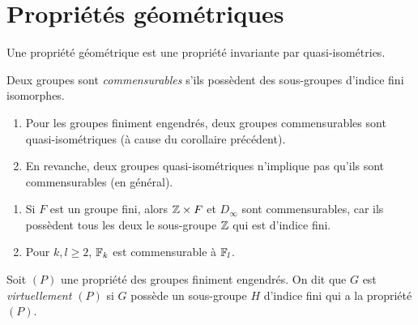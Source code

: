 
\chapter{Propriétés géométriques}
\label{cha:propr-geom}

  Une propriété géométrique est une propriété invariante par quasi-isométries.


  \begin{defi} 
    Deux groupes sont \emph{commensurables} s'ils possèdent des sous-groupes d'indice fini isomorphes.
  \end{defi}

  \begin{rems}
    \begin{enumerate}
    \item Pour les groupes finiment engendrés, deux groupes commensurables sont quasi-isométriques (à cause du
      corollaire précédent).
    \item En revanche, deux groupes quasi-isométriques n'implique pas qu'ils sont commensurables (en général).
    \end{enumerate}
  \end{rems}

  \begin{exs}
    \begin{enumerate}
    \item Si $F$ est un groupe fini, alors $\mathbb{Z} \times F$ et $D_\infty$ sont commensurables, car ils possèdent
      tous les deux le sous-groupe $\mathbb{Z}$ qui est d'indice fini.

    \item Pour $k, l \geq 2$, $\mathbb{F}_k$ est commensurable à $\mathbb{F}_l$.
    \end{enumerate}
  \end{exs}

  \begin{defi}
    Soit $(P)$ une propriété des groupes finiment engendrés. On dit que $G$ est \emph{virtuellement $(P)$}
     si $G$ possède un sous-groupe $H$ d'indice fini qui a la propriété $(P)$.
  \end{defi}

